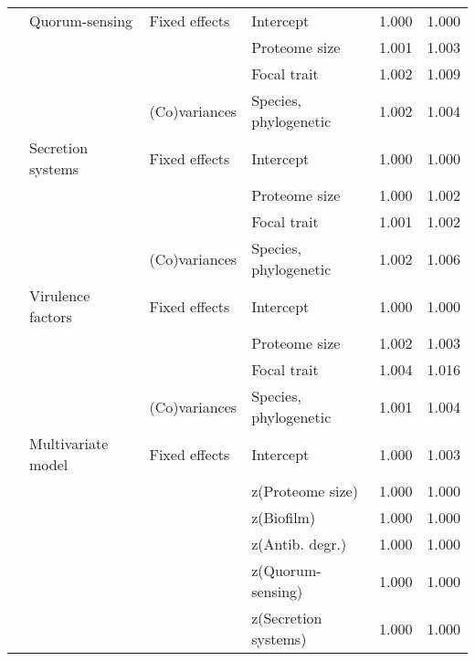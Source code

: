 \begin{longtable}[t]{llllll}
\hspace{1em} & Quorum-sensing & Fixed effects & Intercept & 1.000 & 1.000\\
\hspace{1em} &  &  & Proteome size & 1.001 & 1.003\\
\hspace{1em} &  &  & Focal trait & 1.002 & \vphantom{1} 1.009\\
\hspace{1em} &  & (Co)variances & Species, phylogenetic & 1.002 & \vphantom{1} 1.004\\
\hspace{1em} & Secretion systems & Fixed effects & Intercept & 1.000 & 1.000\\
\hspace{1em} &  &  & Proteome size & 1.000 & 1.002\\
\hspace{1em} &  &  & Focal trait & 1.001 & 1.002\\
\hspace{1em} &  & (Co)variances & Species, phylogenetic & 1.002 & 1.006\\
\hspace{1em} & Virulence factors & Fixed effects & Intercept & 1.000 & 1.000\\
\hspace{1em} &  &  & Proteome size & 1.002 & 1.003\\
\hspace{1em} &  &  & Focal trait & 1.004 & 1.016\\
\hspace{1em} &  & (Co)variances & Species, phylogenetic & 1.001 & 1.004\\
\hspace{1em} & Multivariate model & Fixed effects & Intercept & 1.000 & 1.003\\
\hspace{1em} &  &  & z(Proteome size) & 1.000 & \vphantom{1} 1.000\\
\hspace{1em} &  &  & z(Biofilm) & 1.000 & 1.000\\
\hspace{1em} &  &  & z(Antib. degr.) & 1.000 & 1.000\\
\hspace{1em} &  &  & z(Quorum-sensing) & 1.000 & \vphantom{1} 1.000\\
\hspace{1em} &  &  & z(Secretion systems) & 1.000 & 1.000\\

\end{longtable}
